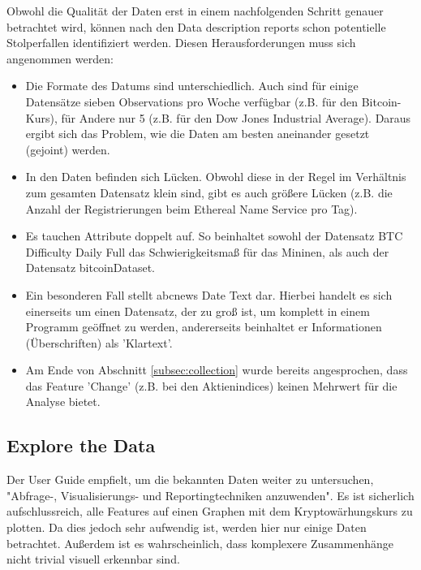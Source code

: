 Obwohl die Qualität der Daten erst in einem nachfolgenden Schritt genauer betrachtet wird, können nach den Data description reports schon potentielle Stolperfallen  identifiziert werden. Diesen Herausforderungen muss sich angenommen werden:
\begin{itemize}
\item Die Formate des Datums sind unterschiedlich. Auch sind für einige Datensätze sieben Observations pro Woche verfügbar (z.B. für den Bitcoin-Kurs), für Andere nur 5 (z.B. für den Dow Jones Industrial Average). Daraus ergibt sich das Problem, wie die Daten am besten aneinander gesetzt (gejoint) werden.
\item In den Daten befinden sich Lücken. Obwohl diese in der Regel im Verhältnis zum gesamten Datensatz klein sind, gibt es auch größere Lücken (z.B. die Anzahl der Registrierungen beim Ethereal Name Service pro Tag).
\item Es tauchen Attribute doppelt auf. So beinhaltet sowohl der Datensatz BTC \textunderscore Difficulty \textunderscore Daily \textunderscore Full das Schwierigkeitsmaß für das Mininen, als auch der Datensatz bitcoinDataset. 
\item Ein besonderen Fall stellt abcnews \textunderscore Date \textunderscore Text dar. Hierbei handelt es sich einerseits um einen Datensatz, der zu groß ist, um komplett in einem Programm geöffnet zu werden, andererseits beinhaltet er Informationen (Überschriften) als 'Klartext'. 
\item Am Ende von Abschnitt \ref{subsec:collection} wurde bereits angesprochen, dass das Feature 'Change' (z.B. bei den Aktienindices) keinen Mehrwert für die Analyse bietet.
\end{itemize}

\subsection{Explore the Data}
Der User Guide empfielt, um die bekannten Daten weiter zu untersuchen, "Abfrage-, Visualisierungs- und Reportingtechniken anzuwenden"\citep[S.~40; eigene Übersetzung]{chapman_crisp-dm_2000}. Es ist sicherlich aufschlussreich, alle Features auf einen Graphen mit dem Kryptowärhungskurs zu plotten. Da dies jedoch sehr aufwendig ist, werden hier nur einige Daten betrachtet. Außerdem ist es wahrscheinlich, dass komplexere Zusammenhänge nicht trivial visuell erkennbar sind.\newline

